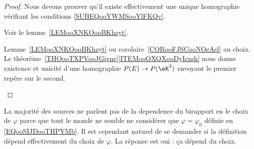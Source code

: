\begin{proof}
	Nous devons prouver qu'il existe effectivement une unique homographie vérifiant les conditions \eqref{SUBEQooYWMSooYlFKQv}.
	\begin{subproof}
		Voir le lemme~\ref{LEMooXNKOooBKhzyt}.

		Lemme~\ref{LEMooXNKOooBKhzyt} ou corolaire~\ref{CORooFJSCooNOeAel} au choix.
		\spitem[Conclusion]
		Le théorème~\ref{THOooTXPVooJGigne}\ref{ITEMooQXQXooDyIsxsh} nous donne existence et unicité d'une homographie \( P(E)\to P(\eK^2) \) envoyant le premier repère sur le second.
	\end{subproof}
\end{proof}

\begin{remark}
	La majorité des sources ne parlent pas de la dependence du birapport en le choix de \( \varphi\) parce que tout le monde ne semble ne considérer que \( \varphi=\varphi_0\) définie en \eqref{EQooSIJDooTHPYMb}. Il est cependant naturel de se demander si la définition dépend effectivement du choix de \( \varphi\). La réponse est oui : ça dépend du choix.
\end{remark}

